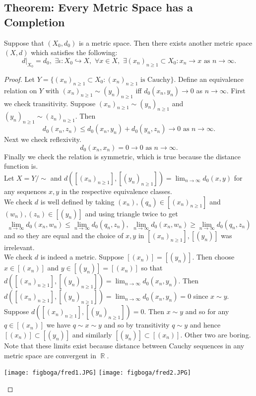 \documentclass{article}
\DeclareMathOperator\R{\mathbb{R}}
\newcommand{\seq}{(x_n)_{n \geq 1}}
\begin{document}
\subsection*{Theorem: Every Metric Space has a Completion}
Suppose that $(X_0,d_0)$ is a metric space. Then there exists
another metric space $(X,d)$ which satisfies the following:
$$
d \vert_{X_0} = d_0, \,\, \exists \iota: X_0 \hookrightarrow X, \,\, \forall x \in X, \,\, \exists \seq \subset X_0: x_n \to x \text{ as } n \to \infty.
$$
\begin{proof}
Let $Y = \{ \seq \subset X_0: \seq \text{ is Cauchy} \}$.
Define an equivalence relation on $Y$ with
$\seq \sim (y_n)_{n \geq 1}$ iff $d_0(x_n,y_n) \to 0$ as $n \to \infty$.
First we check transitivity. Suppose $\seq \sim (y_n)_{n \geq 1}$
and $(y_n)_{n \geq 1} \sim (z_n)_{n \geq 1}$. Then $$
d_0(x_n,z_n) \leq d_0(x_n,y_n) + d_0(y_n,z_n) \to 0 \text{ as }
n \to \infty.
$$
Next we check reflexivity. $$
d_0(x_n,x_n) = 0 \to 0 \text{ as } n \to \infty.
$$
Finally we check the relation is symmetric, which is true because the distance function is. \\ \newline
Let $X = Y \slash \sim$ and $d( [ \seq ], [ (y_n)_{n \geq 1} ]) =
 \lim_{n \to \infty} d_0(x,y)$ for any sequences $x,y$ in the respective
 equivalence classes. \\ \newline We check $d$ is well defined by
taking $(x_n),(q_n) \in [\seq]$ and $(w_n),(z_n) \in [(y_n)]$ and using triangle twice to get $$
\lim_{n \to \infty} d_0(x_n,w_n) \leq \lim_{n \to \infty} d_0(q_n, z_n), \,\, \lim_{n \to \infty} d_0(x_n,w_n) \geq \lim_{n \to \infty} d_0(q_n, z_n)
$$
and so they are equal and the choice of $x,y$ in $[\seq],[(y_n)]$ was irrelevant. \\ \newline
We check $d$ is indeed a metric. Suppose $[(x_n)] = [(y_n)]$.
Then choose $x \in [(x_n)]$ and $y \in [(y_n)] = [(x_n)]$
so that $d( [ \seq ], [ (y_n)_{n \geq 1} ]) = \lim_{n \to \infty} d_0(x_n,y_n)$.
Then $d( [ \seq ], [ (y_n)_{n \geq 1} ]) = \lim_{n \to \infty} d_0(x_n,y_n) = 0$
since $x \sim y$. Suppose $d( [ \seq ], [ (y_n)_{n \geq 1} ]) = 0$. Then $x \sim y$ and so for any $q \in [(x_n)]$ we have
$q \sim x \sim y$ and so by transitivity $q \sim y$ and hence $[(x_n)] \subset [(y_n)]$ and similarly $[(y_n)] \subset [(x_n)]$.
Other two are boring. Note that these limits exist because distance between Cauchy sequences in any metric space are convergent in $\R$.
\begin{center}
\texttt{[image: figboga/fred1.JPG]}
\texttt{[image: figboga/fred2.JPG]}
\end{center}
\end{proof}
\end{document}

